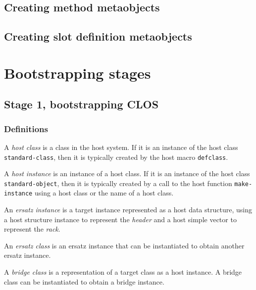 \subsection{Creating method metaobjects}

\subsection{Creating slot definition metaobjects}

\section{Bootstrapping stages}

\subsection{Stage 1, bootstrapping CLOS}

\subsubsection{Definitions}

\begin{definition}
A \emph{host class} is a class in the host system.  If it is an
instance of the host class \texttt{standard-class}, then it is
typically created by the host macro \texttt{defclass}.
\end{definition}

\begin{definition}
A \emph{host instance} is an instance of a host class.  If it is an
instance of the host class \texttt{standard-object}, then it is
typically created by a call to the host function
\texttt{make-instance} using a host class or the name of a host class.
\end{definition}

\begin{definition}
An \emph{ersatz instance} is a target instance represented as a host
data structure, using a host structure instance to represent the
\emph{header} and a host simple vector to represent the \emph{rack}.
\end{definition}

\begin{definition}
An \emph{ersatz class} is an ersatz instance that can be instantiated
to obtain another ersatz instance.
\end{definition}

\begin{definition}
A \emph{bridge class} is a representation of a target class as a host
instance.  A bridge class can be instantiated to obtain a bridge
instance. 
\end{definition}

